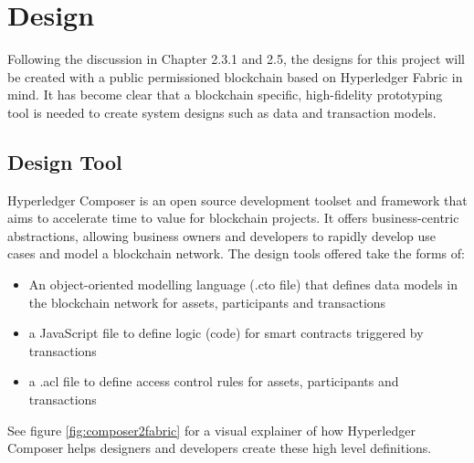 \chapter{Design}
\graphicspath{{Chapter5/Figs/Raster/}{Chapter5/Figs/}}

Following the discussion in Chapter 2.3.1 and 2.5, the designs for this project 
will be created with a public permissioned blockchain based on Hyperledger Fabric in mind.
It has become clear that a blockchain specific, high-fidelity prototyping tool is needed 
to create system designs such as data and transaction models.

\section{Design Tool}

Hyperledger Composer is an open source development toolset and framework that aims to 
accelerate time to value for blockchain projects. It offers business-centric 
abstractions, allowing business owners and developers to rapidly develop 
use cases and model a blockchain network. The design tools offered take the forms of:
\begin{itemize}
    \setlength\itemsep{0em}            
    \item An object-oriented modelling language (.cto file) that defines data models in 
    the blockchain network for assets, participants and transactions
    \item a JavaScript file to define logic (code) for smart contracts triggered by transactions
    \item a .acl file to define access control rules for assets, participants and transactions\\
    \citep{official2018composer}
\end{itemize}

See figure \ref{fig:composer2fabric} for a visual explainer of how Hyperledger Composer 
helps designers and developers create these high level definitions.

